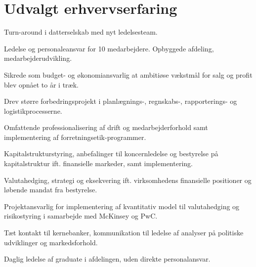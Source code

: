 \documentclass[a4paper]{janus-resume} %
\begin{document}
\hfill
%
%
\begin{minipage}[t]{0.49\textwidth} %


\section{Udvalgt erhvervserfaring}


\vspace{\topsep} %
\begin{tightitemize}
\item Turn-around i datterselskab med nyt ledelsesteam. 
\item Ledelse og personaleansvar for 10 medarbejdere. Opbyggede afdeling, medarbejderudvikling.
\item Sikrede som budget- og økonomiansvarlig at ambitiøse vækstmål for salg og profit blev opnået to år i træk.
\item Drev større forbedringsprojekt i planlægnings-, regnskabs-, rapporterings- og logistikprocesserne.
\item Omfattende professionalisering af drift og medarbejderforhold samt implementering af forretningsetik-programmer. 
\end{tightitemize}

\sectionspace %



\begin{tightitemize}
\item Kapitalstrukturstyring, anbefalinger til koncernledelse og bestyrelse på kapitalstruktur ift. finansielle markeder, samt
implementering.
\item Valutahedging, strategi og eksekvering ift. virksomhedens finansielle positioner og løbende mandat fra bestyrelse.
\item Projektansvarlig for implementering af kvantitativ model til valutahedging og risikostyring i samarbejde med McKinsey og PwC. 
\item Tæt kontakt til kernebanker, kommunikation til ledelse af analyser på politiske udviklinger og markedsforhold.
\item Daglig ledelse af graduate i afdelingen, uden direkte personalansvar.
\end{tightitemize}


\end{minipage}
\end{document}

